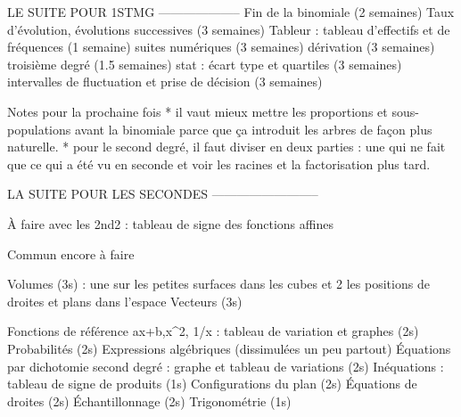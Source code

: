 LE SUITE POUR 1STMG
--------------------
Fin de la binomiale (2 semaines)
Taux d'évolution, évolutions successives    (3 semaines)
Tableur : tableau d'effectifs et de fréquences  (1 semaine)
suites numériques   (3 semaines)
dérivation  (3 semaines)
troisième degré (1.5 semaines)
stat : écart type et quartiles  (3 semaines)
intervalles de fluctuation et prise de décision (3 semaines)



Notes pour la prochaine fois 
* il vaut mieux mettre les proportions et sous-populations avant la binomiale parce que ça introduit les arbres de façon plus naturelle.
* pour le second degré, il faut diviser en deux parties : une qui ne fait que ce qui a été vu en seconde et voir les racines et la factorisation plus tard.


LA SUITE POUR LES SECONDES
--------------------------

À faire avec les 2nd2 : tableau de signe des fonctions affines

Commun encore à faire

Volumes (3s) : une sur les petites surfaces dans les cubes et 2 les positions de droites et plans dans l'espace
Vecteurs (3s)

Fonctions de référence ax+b,x^2, 1/x : tableau de variation et graphes (2s)
Probabilités (2s)
Expressions algébriques (dissimulées un peu partout)
Équations par dichotomie
second degré : graphe et tableau de variations (2s)
Inéquations : tableau de signe de produits (1s)
Configurations du plan (2s)
Équations de droites (2s)
Échantillonnage (2s)
Trigonométrie (1s)


